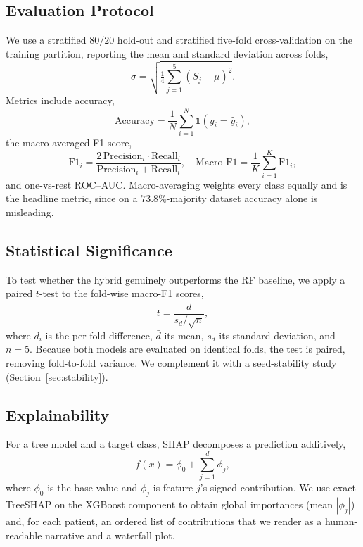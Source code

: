 \documentclass[conference]{IEEEtran}
\begin{document}
\subsection{Evaluation Protocol}
We use a stratified $80/20$ hold-out and stratified five-fold cross-validation on
the training partition, reporting the mean and standard deviation across folds,
\begin{equation}
\sigma=\sqrt{\tfrac{1}{4}\sum_{j=1}^{5}(S_j-\mu)^2}.
\end{equation}
Metrics include accuracy,
\begin{equation}
\mathrm{Accuracy}=\frac{1}{N}\sum_{i=1}^{N}\mathbb{1}(y_i=\hat{y}_i),
\end{equation}
the macro-averaged F1-score,
\begin{equation}
\mathrm{F1}_i=\frac{2\,\mathrm{Precision}_i\cdot\mathrm{Recall}_i}
{\mathrm{Precision}_i+\mathrm{Recall}_i},\quad
\mathrm{Macro\text{-}F1}=\frac{1}{K}\sum_{i=1}^{K}\mathrm{F1}_i,
\end{equation}
and one-vs-rest ROC--AUC. Macro-averaging weights every class equally and is the
headline metric, since on a $73.8\%$-majority dataset accuracy alone is
misleading.

\subsection{Statistical Significance}
To test whether the hybrid genuinely outperforms the RF baseline, we apply a
paired $t$-test to the fold-wise macro-F1 scores,
\begin{equation}
t=\frac{\bar{d}}{s_d/\sqrt{n}},
\label{eq:ttest}
\end{equation}
where $d_i$ is the per-fold difference, $\bar{d}$ its mean, $s_d$ its standard
deviation, and $n{=}5$. Because both models are evaluated on identical folds, the
test is paired, removing fold-to-fold variance. We complement it with a
seed-stability study (Section~\ref{sec:stability}).

\subsection{Explainability}
For a tree model and a target class, SHAP decomposes a prediction additively,
\begin{equation}
f(x)=\phi_0+\sum_{j=1}^{d}\phi_j,
\label{eq:shap}
\end{equation}
where $\phi_0$ is the base value and $\phi_j$ is feature $j$'s signed
contribution. We use exact TreeSHAP on the XGBoost component
to obtain global importances (mean $|\phi_j|$) and, for each patient, an ordered
list of contributions that we render as a human-readable narrative and a waterfall
plot.
\end{document}
